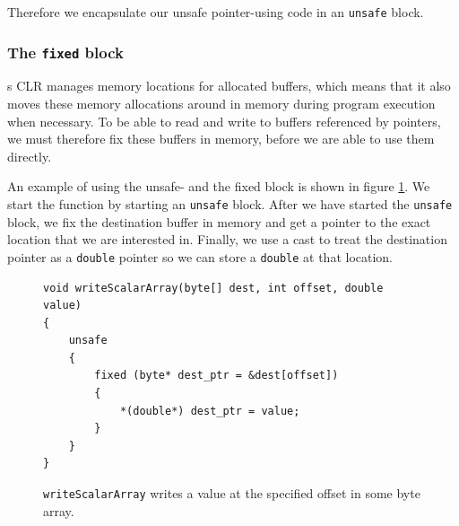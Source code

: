 Therefore we encapsulate our unsafe pointer-using code in an \texttt{unsafe}
block.

\subsubsection{The \texttt{fixed} block}
\csharp{}s CLR manages memory locations for allocated buffers, which means that
it also moves these memory allocations around in memory during program execution
when necessary.
To be able to read and write to buffers referenced by pointers, we must
therefore fix these buffers in memory, before we are able to use them directly.

An example of using the unsafe- and the fixed block is shown in figure
\ref{fig:writeScalarArray'}. We start the function by starting an
\texttt{unsafe} block. After we have started the \texttt{unsafe} block, we fix
the destination buffer in memory and get a pointer to the exact location that we
are interested in. Finally, we use a cast to treat the destination pointer as a
\texttt{double} pointer so we can store a \texttt{double} at that location.
\begin{figure}[h]
\centering
\begin{verbatim}
void writeScalarArray(byte[] dest, int offset, double value)
{
    unsafe
    {
        fixed (byte* dest_ptr = &dest[offset])
        {
            *(double*) dest_ptr = value;
        }
    }
}
\end{verbatim}
\caption{\texttt{writeScalarArray} writes a value at the specified offset in
some byte array.}
\label{fig:writeScalarArray'}
\end{figure}

